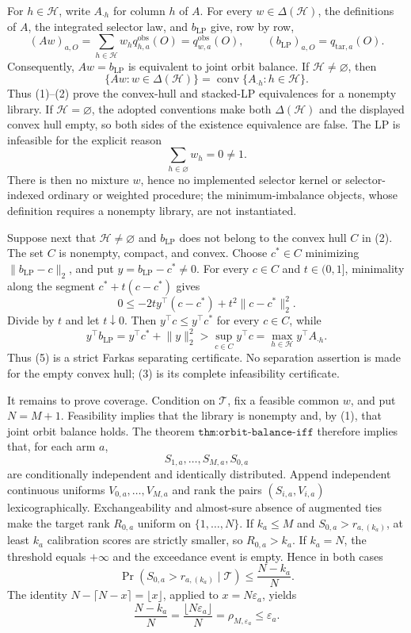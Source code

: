 For \(h\in\mathcal H\), write \(A_{\cdot h}\) for column \(h\) of \(A\). For every \(w\in\Delta(\mathcal H)\), the definitions of \(A\), the integrated selector law, and \(b_{\mathrm{LP}}\) give, row by row,
\[
(Aw)_{a,O}=\sum_{h\in\mathcal H}w_hq^{\mathrm{obs}}_{h,a}(O)=q^{\mathrm{obs}}_{w,a}(O),\qquad
(b_{\mathrm{LP}})_{a,O}=q_{\mathrm{tar},a}(O).
\tag{1}
\]
Consequently, \(Aw=b_{\mathrm{LP}}\) is equivalent to joint orbit balance. If \(\mathcal H\ne\varnothing\), then
\[
\{Aw:w\in\Delta(\mathcal H)\}=\operatorname{conv}\{A_{\cdot h}:h\in\mathcal H\}.
\tag{2}
\]
Thus (1)--(2) prove the convex-hull and stacked-LP equivalences for a nonempty library. If \(\mathcal H=\varnothing\), the adopted conventions make both \(\Delta(\mathcal H)\) and the displayed convex hull empty, so both sides of the existence equivalence are false. The LP is infeasible for the explicit reason
\[
\sum_{h\in\varnothing}w_h=0\ne1.
\tag{3}
\]
There is then no mixture \(w\), hence no implemented selector kernel or selector-indexed ordinary or weighted procedure; the minimum-imbalance objects, whose definition requires a nonempty library, are not instantiated.

Suppose next that \(\mathcal H\ne\varnothing\) and \(b_{\mathrm{LP}}\) does not belong to the convex hull \(C\) in (2). The set \(C\) is nonempty, compact, and convex. Choose \(c^*\in C\) minimizing \(\lVert b_{\mathrm{LP}}-c\rVert_2\), and put \(y=b_{\mathrm{LP}}-c^*\ne0\). For every \(c\in C\) and \(t\in(0,1]\), minimality along the segment \(c^*+t(c-c^*)\) gives
\[
0\le-2t y^\top(c-c^*)+t^2\lVert c-c^*\rVert_2^2.
\tag{4}
\]
Divide by \(t\) and let \(t\downarrow0\). Then \(y^\top c\le y^\top c^*\) for every \(c\in C\), while
\[
y^\top b_{\mathrm{LP}}=y^\top c^*+\lVert y\rVert_2^2>\sup_{c\in C}y^\top c=\max_{h\in\mathcal H}y^\top A_{\cdot h}.
\tag{5}
\]
Thus (5) is a strict Farkas separating certificate. No separation assertion is made for the empty convex hull; (3) is its complete infeasibility certificate.

It remains to prove coverage. Condition on \(\mathcal T\), fix a feasible common \(w\), and put \(N=M+1\). Feasibility implies that the library is nonempty and, by (1), that joint orbit balance holds. The theorem \(\texttt{thm:orbit-balance-iff}\) therefore implies that, for each arm \(a\),
\[
S_{1,a},\ldots,S_{M,a},S_{0,a}
\tag{6}
\]
are conditionally independent and identically distributed. Append independent continuous uniforms \(V_{0,a},\ldots,V_{M,a}\) and rank the pairs \((S_{i,a},V_{i,a})\) lexicographically. Exchangeability and almost-sure absence of augmented ties make the target rank \(R_{0,a}\) uniform on \(\{1,\ldots,N\}\). If \(k_a\le M\) and \(S_{0,a}>r_{a,(k_a)}\), at least \(k_a\) calibration scores are strictly smaller, so \(R_{0,a}>k_a\). If \(k_a=N\), the threshold equals \(+\infty\) and the exceedance event is empty. Hence in both cases
\[
\Pr\!\left(S_{0,a}>r_{a,(k_a)}\mid\mathcal T\right)
\le\frac{N-k_a}{N}.
\tag{7}
\]
The identity \(N-\lceil N-x\rceil=\lfloor x\rfloor\), applied to \(x=N\varepsilon_a\), yields
\[
\frac{N-k_a}{N}=\frac{\lfloor N\varepsilon_a\rfloor}{N}=\rho_{M,\varepsilon_a}\le\varepsilon_a.
\tag{8}
\]

